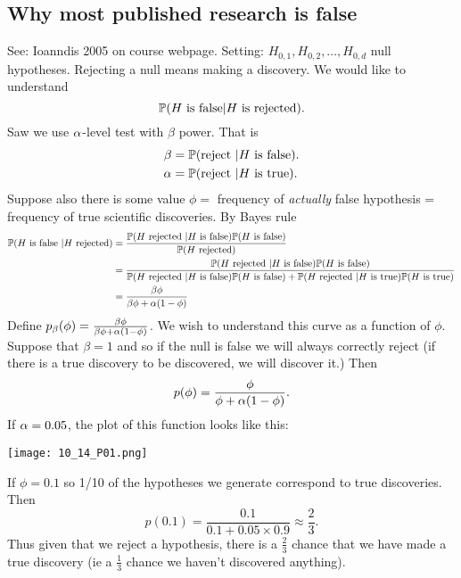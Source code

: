 \subsection{Why most published research is false}
See: Ioanndis 2005 on course webpage. Setting: $H_{0,1},H_{0,2},\ldots,H_{0,d}$ null hypotheses. Rejecting a null means making a discovery. We would like to understand 
\[{\mathbb{P}}(H \text{ is false}| H \text{ is rejected}). \]
Saw we use ${\alpha}$-level test with $\beta$ power. That is 
\begin{align*}
    \beta &= {\mathbb{P}}(\text{reject }| H \text{ is false}).\\
    {\alpha} &= {\mathbb{P}}(\text{reject }| H \text{ is true}).
\end{align*} 
Suppose also there is some value $\phi = $ frequency of \emph{actually} false hypothesis = frequency of true scientific discoveries. By Bayes rule
\begin{align*}
    {\mathbb{P}}(H \text{ is false }| H \text{ rejected}) & = \frac{{\mathbb{P}}(H \text{ rejected }|H \text{ is false}){\mathbb{P}}(H \text{ is false})}{{\mathbb{P}}(H \text{ rejected})}\\
    &=\frac{{\mathbb{P}}(H \text{ rejected }|H \text{ is false}){\mathbb{P}}(H \text{ is false})}{{\mathbb{P}}(H \text{ rejected }|H \text{ is false}){\mathbb{P}}(H \text{ is false})+{\mathbb{P}}(H \text{ rejected }|H \text{ is true}){\mathbb{P}}(H \text{ is true})}\\
    &=\frac{\beta \phi}{\beta \phi + {\alpha}(1-\phi)}
\end{align*}
Define $p_\beta(\phi) = \frac{\beta \phi}{\beta \phi + {\alpha}(1-\phi)}$. We wish to understand this curve as a function of $\phi$. Suppose that $\beta=1$ and so if the null is false we will always correctly reject (if there is a true discovery to be discovered, we will discover it.) Then 
\[p(\phi) = \frac{\phi}{\phi+{\alpha}(1-\phi)}. \]
If ${\alpha} = 0.05$, the plot of this function looks like this:
\begin{center}
   \texttt{[image: 10\_14\_P01.png]}
\end{center}
If $\phi = 0.1$ so 1/10 of the hypotheses we generate correspond to true discoveries. Then \[p(0.1) = \frac{0.1}{0.1+0.05\times 0.9} \approx \frac{2}{3}.\]
Thus given that we reject a hypothesis, there is a $\frac{2}{3}$ chance that we have made a true discovery (ie a $\frac{1}{3}$ chance we haven't discovered anything).

